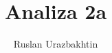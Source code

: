 \documentclass[11pt, a4paper]{article}
\begin{document}
\title{Analiza 2a}
\author{Ruslan Urazbakhtin}
\maketitle

\newpage
\tableofcontents
\newpage



% 

% 
\end{document}
